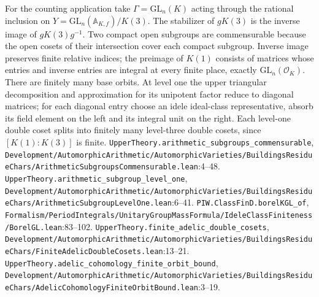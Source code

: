 For the counting application take $\Gamma=\mathrm{GL}_n(K)$ acting through the rational inclusion on $Y=\mathrm{GL}_n(\mathbb A_{K,f})/K(3)$. The stabilizer of $gK(3)$ is the inverse image of $gK(3)g^{-1}$. Two compact open subgroups are commensurable because the open cosets of their intersection cover each compact subgroup. Inverse image preserves finite relative indices; the preimage of $K(1)$ consists of matrices whose entries and inverse entries are integral at every finite place, exactly $\mathrm{GL}_n(\mathcal O_K)$. There are finitely many base orbits. At level one the upper triangular decomposition and approximation for its unipotent factor reduce to diagonal matrices; for each diagonal entry choose an idele ideal-class representative, absorb its field element on the left and its integral unit on the right. Each level-one double coset splits into finitely many level-three double cosets, since $[K(1):K(3)]$ is finite.
{\footnotesize\nolinkurl{UpperTheory.arithmetic_subgroups_commensurable}, \nolinkurl{Development/AutomorphicArithmetic/AutomorphicVarieties/BuildingsResidueChars/ArithmeticSubgroupsCommensurable.lean}\allowbreak:4--48.} {\footnotesize\nolinkurl{UpperTheory.arithmetic_subgroup_level_one}, \nolinkurl{Development/AutomorphicArithmetic/AutomorphicVarieties/BuildingsResidueChars/ArithmeticSubgroupLevelOne.lean}\allowbreak:6--41.} {\footnotesize\nolinkurl{PIW.ClassFinD.borelKGL_of}, \nolinkurl{Formalism/PeriodIntegrals/UnitaryGroupMassFormula/IdeleClassFiniteness/BorelGL.lean}\allowbreak:83--102.} {\footnotesize\nolinkurl{UpperTheory.finite_adelic_double_cosets}, \nolinkurl{Development/AutomorphicArithmetic/AutomorphicVarieties/BuildingsResidueChars/FiniteAdelicDoubleCosets.lean}\allowbreak:13--21.} {\footnotesize\nolinkurl{UpperTheory.adelic_cohomology_finite_orbit_bound}, \nolinkurl{Development/AutomorphicArithmetic/AutomorphicVarieties/BuildingsResidueChars/AdelicCohomologyFiniteOrbitBound.lean}\allowbreak:3--19.}

